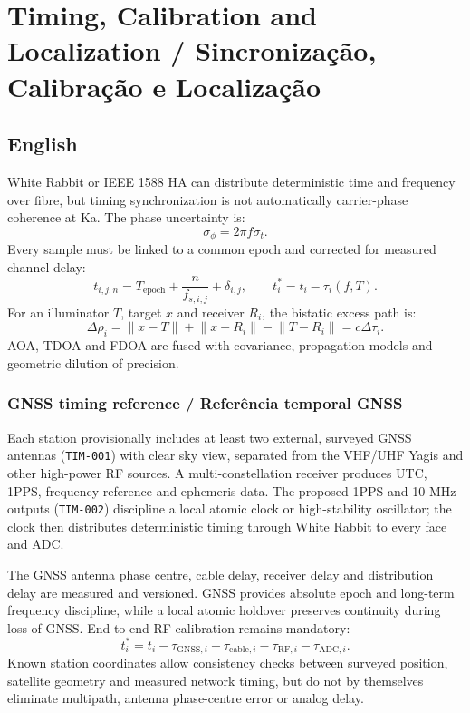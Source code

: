 \chapter{Timing, Calibration and Localization / Sincronização, Calibração e Localização}

\section*{English}
White Rabbit or IEEE 1588 HA can distribute deterministic time and frequency over fibre, but timing synchronization is not automatically carrier-phase coherence at Ka. The phase uncertainty is:
\[
\sigma_\phi=2\pi f\sigma_t.
\]
Every sample must be linked to a common epoch and corrected for measured channel delay:
\[
t_{i,j,n}=T_{\mathrm{epoch}}+\frac{n}{f_{s,i,j}}+\delta_{i,j},\qquad t_i^\ast=t_i-\tau_i(f,T).
\]
For an illuminator $T$, target $x$ and receiver $R_i$, the bistatic excess path is:
\[
\Delta\rho_i=\lVert x-T\rVert+\lVert x-R_i\rVert-\lVert T-R_i\rVert=c\Delta\tau_i.
\]
AOA, TDOA and FDOA are fused with covariance, propagation models and geometric dilution of precision.

\subsection*{GNSS timing reference / Referência temporal GNSS}
Each station provisionally includes at least two external, surveyed GNSS antennas (\texttt{TIM-001}) with clear sky view, separated from the VHF/UHF Yagis and other high-power RF sources. A multi-constellation receiver produces UTC, 1PPS, frequency reference and ephemeris data. The proposed 1PPS and 10 MHz outputs (\texttt{TIM-002}) discipline a local atomic clock or high-stability oscillator; the clock then distributes deterministic timing through White Rabbit to every face and ADC.

The GNSS antenna phase centre, cable delay, receiver delay and distribution delay are measured and versioned. GNSS provides absolute epoch and long-term frequency discipline, while a local atomic holdover preserves continuity during loss of GNSS. End-to-end RF calibration remains mandatory:
\[
t_i^\ast=t_i-\tau_{\mathrm{GNSS},i}-\tau_{\mathrm{cable},i}-\tau_{\mathrm{RF},i}-\tau_{\mathrm{ADC},i}.
\]
Known station coordinates allow consistency checks between surveyed position, satellite geometry and measured network timing, but do not by themselves eliminate multipath, antenna phase-centre error or analog delay.

